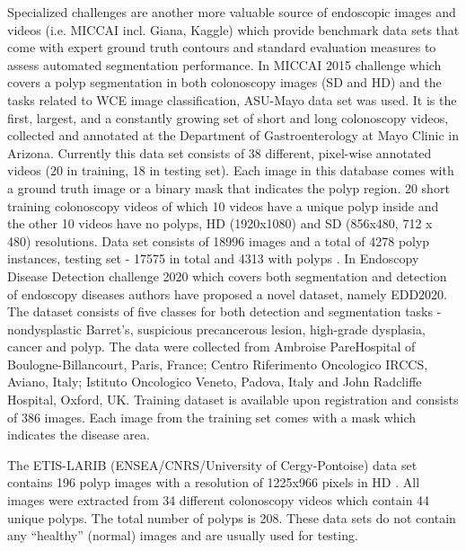 \documentclass[preprint]{article}
\begin{document}
Specialized challenges are another more valuable source of endoscopic images and videos (i.e. MICCAI incl. Giana, Kaggle) which provide benchmark data sets that come with expert ground truth contours and standard evaluation measures to assess automated segmentation performance. 
In MICCAI 2015 challenge which covers a polyp segmentation in both colonoscopy images (SD and HD) and the tasks related to WCE image classification, ASU-Mayo data set was used. It is the first, largest, and a constantly growing set of short and long colonoscopy videos, collected and annotated at the Department of Gastroenterology at Mayo Clinic in Arizona. Currently this data set consists of 38 different, pixel-wise annotated videos (20 in training, 18 in testing set). Each image in this database comes with a ground truth image or a binary mask that indicates the polyp region. 20 short training colonoscopy videos of which 10 videos have a unique polyp inside and the other 10 videos have no polyps, HD (1920x1080) and SD (856x480, 712 x 480)  resolutions. Data set consists of 18996 images and a total of 4278 polyp instances, testing set -  17575 in total and 4313 with polyps \cite{Mayo}. 
In Endoscopy Disease Detection challenge 2020\cite{EDD2020} which covers both segmentation and detection of endoscopy diseases authors have proposed a novel dataset, namely EDD2020. The dataset consists of five classes for both detection and segmentation tasks - nondysplastic Barret's, suspicious precancerous lesion, high-grade dysplasia, cancer and polyp. The data were collected from Ambroise PareHospital of Boulogne-Billancourt, Paris, France; Centro Riferimento Oncologico IRCCS, Aviano, Italy; Istituto Oncologico Veneto, Padova, Italy and John
Radcliffe Hospital, Oxford, UK. Training dataset is available upon registration and consists of 386 images. Each image from the training set comes with a mask which indicates the disease area.

The ETIS-LARIB (ENSEA/CNRS/University of Cergy-Pontoise) data set contains 196 polyp images with a resolution of 1225x966 pixels in HD \cite{ETIS}. All images were extracted from 34 different colonoscopy videos which contain 44 unique polyps. The total number of polyps is 208. These data sets do not contain any “healthy” (normal) images and are usually used for testing.
\end{document}
